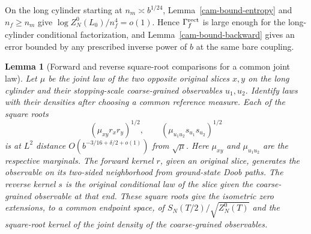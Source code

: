 \documentclass[11pt,a4paper]{article}
\newtheorem{lemma}[theorem]{Lemma}
\numberwithin{equation}{section}
\begin{document}
On the long cylinder starting at \(n_m\asymp b^{1/24}\), Lemma~\ref{cam-bound-entropy} and \(n_f\ge n_m\) give \(\log Z_N^0(L_0)/n_f^4=o(1)\). Hence \(\Gamma_f^{\rm rect}\) is large enough for the long-cylinder conditional factorization, and Lemma~\ref{cam-bound-backward} gives an error bounded by any prescribed inverse power of \(b\) at the same bare coupling.

\begin{lemma}[Forward and reverse square-root comparisons for a common joint law]\label{cam-bound-arms}
Let \(\mu\) be the joint law of the two opposite original slices \(x,y\) on the long cylinder and their stopping-scale coarse-grained observables \(u_1,u_2\). Identify laws with their densities after choosing a common reference measure. Each of the square roots
\[
 (\mu_{xy}r_x r_y)^{1/2},\qquad
 (\mu_{u_1u_2}s_{u_1}s_{u_2})^{1/2}
\]
is at \(L^2\) distance \(O(b^{-3/16+\delta/2+o(1)})\) from \(\sqrt\mu\). Here \(\mu_{xy}\) and \(\mu_{u_1u_2}\) are the respective marginals. The forward kernel \(r\), given an original slice, generates the observable on its two-sided neighborhood from ground-state Doob paths. The reverse kernel \(s\) is the original conditional law of the slice given the coarse-grained observable at that end. These square roots give the isometric zero extensions, to a common endpoint space, of \(S_N(T/2)/\sqrt{Z_N^0(T)}\) and the square-root kernel of the joint density of the coarse-grained observables.
\end{lemma}
\end{document}
